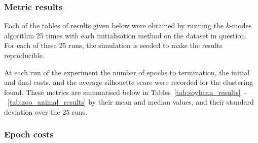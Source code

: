 \subsubsection{Metric results}

Each of the tables of results given below were obtained by running the
\(k\)-modes algorithm 25 times with each initialisation method on the dataset in
question. For each of these 25 runs, the simulation is seeded to make the
results reproducible.

At each run of the experiment the number of epochs to termination, the initial
and final costs, and the average silhouette score were recorded for the
clustering found. These metrics are summarised below in
Tables~\ref{tab:soybean_results}~\--~\ref{tab:zoo_animal_results} by their mean and
median values, and their standard deviation over the 25 runs.

\singlespacing%
\begin{table}[H]
    \centering
    \resizebox{.9\textwidth}{!}{%
        
    }
    \label{tab:soybean_results}\vspace{20pt}

    \resizebox{.9\textwidth}{!}{%
        
    }
    \label{tab:mushroom_results}
\end{table}

\begin{table}[H]
    \centering
    \resizebox{.9\textwidth}{!}{%
        
    }
    \label{tab:breast_cancer_results}\vspace{20pt}

    \resizebox{.9\textwidth}{!}{%
        
    }
    \label{tab:zoo_animal_results}
\end{table}
\doublespacing%

\subsubsection{Epoch costs}

